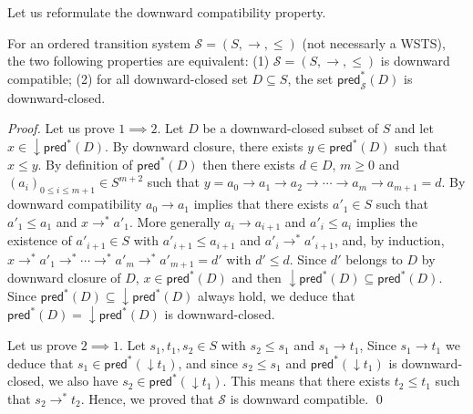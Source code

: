 \documentclass[runningheads]{llncs}
\newcommand{\pred}{\textsf{pred}}
\begin{document}
Let us reformulate the downward compatibility property.

\begin{lemma}
For an ordered transition system $\mathscr{S}=(S, \rightarrow, \leq)$ (not necessarly a WSTS), the two following properties are equivalent: (1) $\mathscr{S}=(S, \rightarrow, \leq)$ is downward compatible; (2) for all downward-closed set $D \subseteq S$, the set $\pred_{\mathscr{S}}^*(D)$ is downward-closed.
\end{lemma}

\begin{proof}
Let us prove $1 \implies 2$. 
Let $D$ be a downward-closed subset of $S$
and let $x \in \downarrow \pred^*(D)$.
By downward closure, there exists
$y \in \pred^*(D)$ 
such that $x \leq y$.
By definition of $\pred^*(D)$ then there exists 
$d \in D$, $m\geq 0$ and $(a_i)_{0 \leq i \leq m+1} \in S^{m+2}$ such that
$y = a_0 \to a_1 \to a_2 \to \cdots \to a_m \to a_{m+1} = d$.
%
By downward compatibility $a_0 \to a_1$
implies that there exists $a'_1 \in S$ such that $a'_1 \leq a_1$ and
$x \to^* a'_1$.
More generally $a_i \to a_{i+1}$ and
$a'_i\leq a_i$ implies the existence of $a'_{i+1} \in S$ with $a'_{i+1} \leq a_{i+1}$ and
$a'_i \to^* a'_{i+1}$,
and, by induction,
 $x \to^* a'_1 \to^* \cdots \to^* a'_{m} \to^* a'_{m+1} = d'$
with $d' \leq d$.
Since
$d'$ 
belongs to $D$ by downward closure of $D$, $x \in \pred^*(D)$ and then $\downarrow\pred^*(D) \subseteq \pred^*(D)$. Since $\pred^*(D) \subseteq \downarrow \pred^*(D)$ always hold, we deduce that $\pred^*(D)=\downarrow\pred^*(D)$ is downward-closed.

Let us prove $2 \implies 1$. Let $s_1, t_1 , s_2 \in S$ with $s_2 \leq s_1$  and $s_1 \rightarrow t_1$, Since $s_1 \rightarrow t_1$ we deduce that $s_1 \in \pred^*(\downarrow t_1)$, and since $s_2 \leq s_1$ and $\pred^*(\downarrow t_1)$ is downward-closed, we also have $s_2 \in \pred^*(\downarrow t_1)$. This means that there exists $t_2 \leq t_1$ such that 
$s_2 \rightarrow^{*} t_2$. Hence, we proved that $\mathscr{S}$ is downward compatible.
\qed


\end{proof}
\end{document}
